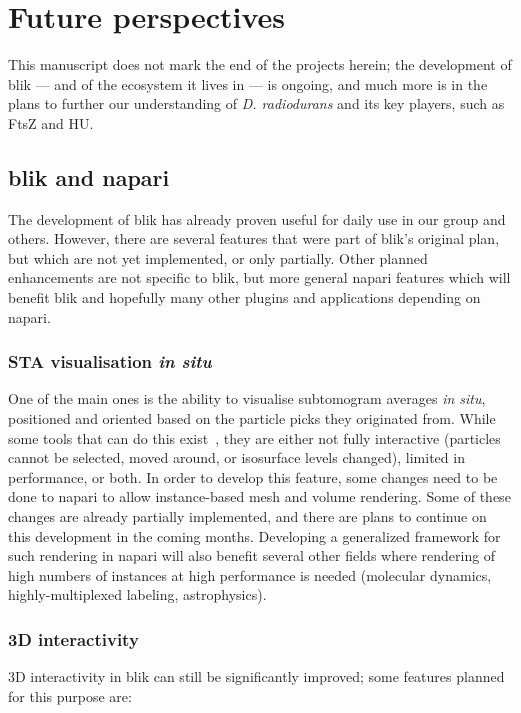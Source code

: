 \chapter{Future perspectives}\label{future}

This manuscript does not mark the end of the projects herein; the development of blik --- and of the ecosystem it lives in --- is ongoing, and much more is in the plans to further our understanding of \textit{D. radiodurans} and its key players, such as FtsZ and HU.

\localtableofcontents

\section{blik and napari}

The development of blik has already proven useful for daily use in our group and others.
However, there are several features that were part of blik's original plan, but which are not yet implemented, or only partially.
Other planned enhancements are not specific to blik, but more general napari features which will benefit blik and hopefully many other plugins and applications depending on napari.

\subsection{STA visualisation \textit{in situ}}
One of the main ones is the ability to visualise subtomogram averages \textit{in situ}, positioned and oriented based on the particle picks they originated from.
While some tools that can do this exist~\cite{ermelArtiaXElectronTomography2022}, they are either not fully interactive (particles cannot be selected, moved around, or isosurface levels changed), limited in performance, or both.
In order to develop this feature, some changes need to be done to napari to allow instance-based mesh and volume rendering.
Some of these changes are already partially implemented, and there are plans to continue on this development in the coming months.
Developing a generalized framework for such rendering in napari will also benefit several other fields where rendering of high numbers of instances at high performance is needed (molecular dynamics, highly-multiplexed labeling, astrophysics).

\subsection{3D interactivity}
3D interactivity in blik can still be significantly improved; some features planned for this purpose are:

